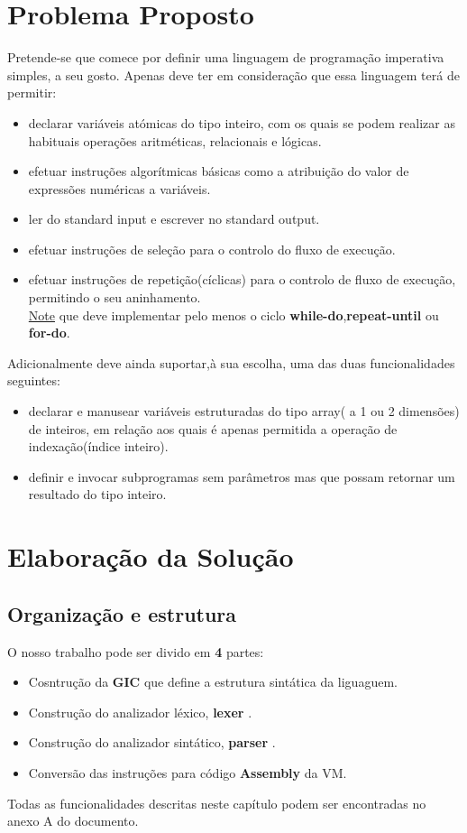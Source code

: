 \documentclass[11pt,a4paper]{report}
\begin{document}
\newpage

\chapter{Problema Proposto}

Pretende-se que comece por definir uma linguagem de programação imperativa simples, a seu gosto.
Apenas deve ter em consideração que essa linguagem terá de permitir:
\begin{itemize}
	\item declarar variáveis atómicas do tipo inteiro, com os quais se podem realizar as habituais operações aritméticas, relacionais e lógicas.
	\item efetuar instruções algorítmicas básicas como a atribuição do valor de expressões numéricas a variáveis.
	\item ler do standard input e escrever no standard output.
    \item efetuar instruções de seleção para o controlo do fluxo de execução.
    \item efetuar instruções de repetição(cíclicas) para o controlo de fluxo de execução, permitindo o seu aninhamento.\\
    \underline{Note} que deve implementar pelo menos o ciclo \textbf{while-do},\textbf{repeat-until} ou \textbf{for-do}.
\end{itemize}
Adicionalmente deve ainda suportar,à sua escolha, uma das duas funcionalidades seguintes:
\begin{itemize}
    \item declarar e manusear variáveis estruturadas do tipo array( a 1 ou 2 dimensões) de inteiros, em relação aos quais é apenas permitida a operação de indexação(índice inteiro).
    \item definir e invocar subprogramas sem parâmetros mas que possam retornar um resultado do tipo inteiro.
\end{itemize}

\newpage

\chapter{Elaboração da Solução}
\section{Organização e estrutura}
O nosso trabalho pode ser divido em \textbf{4} partes:
\begin{itemize}
\item Cosntrução da \textbf{GIC} que define a estrutura sintática da liguaguem.
\item Construção do analizador léxico, \textbf{lexer} .
\item Construção do analizador sintático, \textbf{parser} .
\item Conversão das instruções para código \textbf{Assembly} da  VM.    
\end{itemize}
Todas as funcionalidades descritas neste capítulo podem ser encontradas no anexo A do documento. \\ \\
\end{document}
